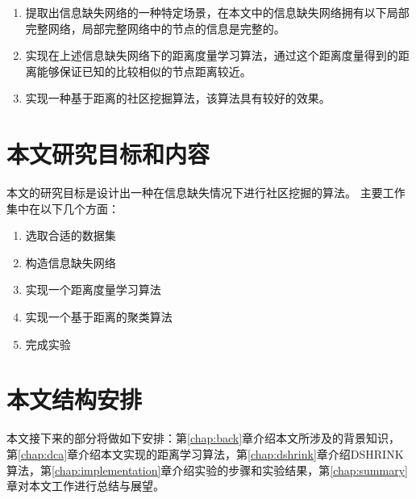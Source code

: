 \begin{enumerate}
\item 提取出信息缺失网络的一种特定场景，在本文中的信息缺失网络拥有以下局部完整网络，局部完整网络中的节点的信息是完整的。
\item 实现在上述信息缺失网络下的距离度量学习算法，通过这个距离度量得到的距离能够保证已知的比较相似的节点距离较近。
\item 实现一种基于距离的社区挖掘算法，该算法具有较好的效果。
\end{enumerate}

\section{本文研究目标和内容}

本文的研究目标是设计出一种在信息缺失情况下进行社区挖掘的算法。
主要工作集中在以下几个方面：

\begin{enumerate}
\item 选取合适的数据集
\item 构造信息缺失网络
\item 实现一个距离度量学习算法
\item 实现一个基于距离的聚类算法
\item 完成实验
\end{enumerate}

\section{本文结构安排}

本文接下来的部分将做如下安排：第\ref{chap:back}章介绍本文所涉及的背景知识，
第\ref{chap:dca}章介绍本文实现的距离学习算法，第\ref{chap:dshrink}章介绍DSHRINK算法，第\ref{chap:implementation}章介绍实验的步骤和实验结果，第\ref{chap:summary}章对本文工作进行总结与展望。
